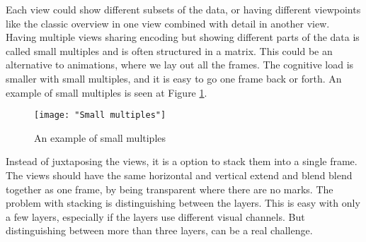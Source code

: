 \documentclass[Report.tex]{subfiles}
\begin{document}
Each view could show different subsets of the data, or having different viewpoints like the classic overview in one view  combined with detail in another view. 
Having multiple views sharing encoding but showing different parts of the data is called small multiples and is often structured in a matrix. This could be an alternative to animations, where we lay out all the frames. The cognitive load is smaller with small multiples, and it is easy to go one frame back or forth. An example of small multiples is seen at Figure \ref{fig:smallmultiples}.
\begin{figure}
\center
\texttt{[image: "Small multiples"]}
\caption{An example of small multiples}
\label{fig:smallmultiples}
\end{figure}
Instead of juxtaposing the views, it is a option to stack them into a single frame. The views should have the same horizontal and vertical extend and blend blend together as one frame, by being transparent where there are no marks. The problem with stacking is distinguishing between the layers. This is easy with only a few layers, especially if the layers use different visual channels. But distinguishing between more than three layers, can be a real challenge. \cite[Chapter 12]{Tamara}
\end{document}
